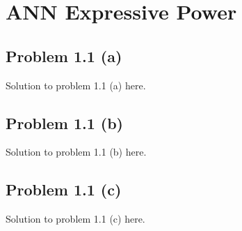 \section{ANN Expressive Power}
\subsection*{Problem 1.1 (a)}
Solution to problem 1.1 (a) here.
\subsection*{Problem 1.1 (b)}
Solution to problem 1.1 (b) here.
\subsection*{Problem 1.1 (c)}
Solution to problem 1.1 (c) here.